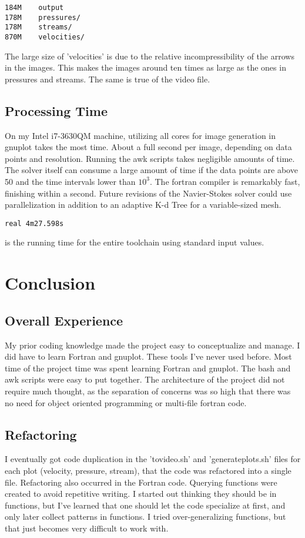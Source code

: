 \documentclass[listof=totoc]{report}
\begin{document}
\begin{verbatim}
184M	output
178M	pressures/
178M	streams/
870M	velocities/
\end{verbatim}

The large size of 'velocities' is due to the relative incompressibility of the arrows in the images. This makes the images around ten times as large as the ones in pressures and streams. The same is true of the video file.

\section{Processing Time}
On my Intel i7-3630QM machine, utilizing all cores for image generation in gnuplot takes the most time. About a full second per image, depending on data points and resolution. Running the awk scripts takes negligible amounts of time. The solver itself can consume a large amount of time if the data points are above 50 and the time intervals lower than $10^3$. The fortran compiler is remarkably fast, finishing within a second. Future revisions of the Navier-Stokes solver could use parallelization in addition to an adaptive K-d Tree for a variable-sized mesh.
\begin{verbatim}
real 4m27.598s
\end{verbatim} is the running time for the entire toolchain using standard input values.

\chapter{Conclusion}
\section{Overall Experience}
My prior coding knowledge made the project easy to conceptualize and manage. I did have to learn Fortran and gnuplot. These tools I've never used before. Most time of the project time was spent learning Fortran and gnuplot. The bash and awk scripts were easy to put together. The architecture of the project did not require much thought, as the separation of concerns was so high that there was no need for object oriented programming or multi-file fortran code.

\section{Refactoring}
I eventually got code duplication in the 'tovideo.sh' and 'generate\textunderscore plots.sh' files for each plot (velocity, pressure, stream), that the code was refactored into a single file. Refactoring also occurred in the Fortran code. Querying functions were created to avoid repetitive writing. I started out thinking they should be in functions, but I've learned that one should let the code specialize at first, and only later collect patterns in functions. I tried over-generalizing functions, but that just becomes very difficult to work with.
\end{document}
